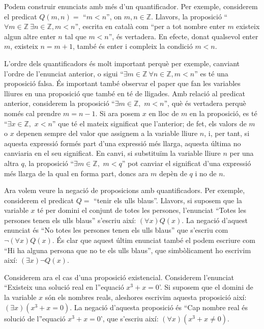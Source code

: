 \bigskip

Podem construir enunciats amb més d'un quantificador. Per exemple,
considerem el predicat $Q(m,n)=$ \enquote{$m<n$}, on $m,n\in\mathbb{Z}$. Llavors, la
proposició \enquote{$\forall m\in\mathbb{Z}~\exists n\in\mathbb{Z},m<n$},
escrita en català com \enquote{per a tot nombre enter $m$ existeix algun altre
enter $n$ tal que $m<n$}, és vertadera. En efecte, donat qualsevol enter
$m$, existeix $n=m+1$, també és enter i compleix la condició $m<n.$

\bigskip

L'ordre dels quantificadors és molt important perquè per exemple,
canviant l'ordre de l'enunciat anterior, o sigui \enquote{$\exists m\in\mathbb{Z}~\forall n\in\mathbb{Z},m<n$} es té una proposició falsa. És
important també observar el paper que fan les variables lliures en una
proposició que també en té de lligades. Amb relació al
predicat anterior, considerem la proposició \enquote{$\exists m\in\mathbb{Z},$ $m<n$}, què és vertadera perquè només cal prendre $m=n-1$. Si
ara posem $x$ en lloc de $m$ en la proposició, es té \enquote{$\exists x\in\mathbb{Z},$ $x<n$} que té el mateix significat que l'anterior; de fet,
els valors de $m$ o $x$ depenen sempre del valor que assignem a la variable
lliure $n$, i, per tant, si aquesta expressió formés part d'una
expressió més llarga, aquesta última no canviaria en el seu
significat. En canvi, si substituïm la variable lliure $n$ per una
altra $q$, la proposició \enquote{$\exists m\in\mathbb{Z},$ $m<q$} pot canviar
el significat d'una expressió més llarga de la qual en forma part,
doncs ara $m$ depèn de $q$ i no de $n$.

\bigskip

Ara volem veure la negació de proposicions amb quantificadors. Per
exemple, considerem el predicat $Q=$ \enquote{tenir els ulls blaus}. Llavors, si
suposem que la variable $x$ té per domini el conjunt de totes les
persones, l'enunciat \enquote{Totes les persones tenen els ulls blaus} s'escriu així: $\left( \forall x\right) Q(x)$. La negació d'aquest enunciat
és \enquote{No totes les persones tenen els ulls blaus} que s'escriu com $\lnot\left( \forall x\right) Q(x)$. És clar que aquest últim
enunciat també el podem escriure com \enquote{Hi ha alguna persona que no te els
ulls blaus}, que simbòlicament ho escrivim així: $\left( \exists
x\right) \lnot Q\left( x\right).$

Considerem ara el cas d'una proposició existencial. Considerem
l'enunciat \enquote{Existeix una solució real en l}equació $x^{3}+x=0$'. Si
suposem que el domini de la variable $x$ són els nombres reals,
aleshores escrivim aquesta proposició així: $\left( \exists
x\right) \left( x^{3}+x=0\right).$ La negació d'aquesta proposició
és \enquote{Cap nombre real és solució de l}equació $x^{3}+x=0$',
que s'escriu així: $\left( \forall x\right) \left( x^{3}+x\neq0\right).$

